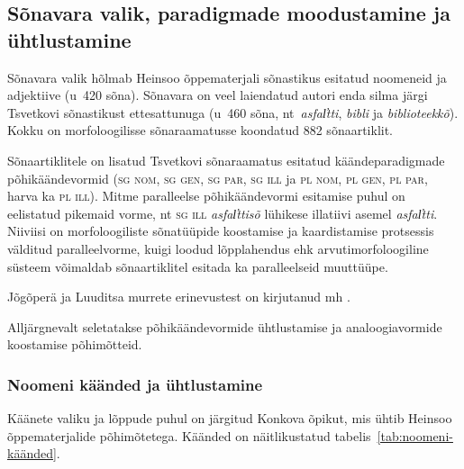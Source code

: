 \documentclass[12pt,a4paper]{article}
\newcommand{\vadja}[1]{\textit{#1}}
\newcommand{\msd}[1]{\textsc{#1}}
\begin{document}
\subsection{Sõnavara valik, paradigmade moodustamine ja ühtlustamine}
\label{sec:sõnavara-valik}

Sõnavara valik hõlmab Heinsoo õppematerjali sõnastikus esitatud noomeneid ja adjektiive (u~420 sõna). Sõnavara on veel laiendatud autori enda silma järgi Tsvetkovi sõnastikust ettesattunuga (u~460 sõna, nt~\vadja{asfal̕tti}, \vadja{bibli} ja \vadja{biblioteekkõ}). Kokku on morfoloogilisse sõnaraamatusse koondatud 882 sõna\-artiklit.

Sõnaartiklitele on lisatud Tsvetkovi sõnaraamatus esitatud käände\-paradigmade põhi\-käände\-vormid (\msd{sg nom}, \msd{sg gen}, \msd{sg par}, \msd{sg ill} ja  \msd{pl nom}, \msd{pl gen}, \msd{pl par}, harva ka \msd{pl ill}). Mitme paralleelse põhikäändevormi esitamise puhul on eelistatud pikemaid vorme, nt \msd{sg ill} \vadja{asfal̕ttisõ} lühikese illatiivi asemel \vadja{asfal̕tti}. Niiviisi on morfoloogiliste sõnatüüpide koostamise ja kaardistamise protsessis välditud paralleelvorme, kuigi loodud lõpplahendus ehk arvutimorfoloogiline süsteem võimaldab sõna\-artiklitel esitada ka paralleelseid muuttüüpe.

Jõgõperä ja Luuditsa murrete erinevustest on kirjutanud mh \cite{rozhanskiy_dialectal_2015}. %

Alljärgnevalt seletatakse põhikäändevormide ühtlustamise ja analoogiavormide koostamise põhimõtteid. %


\subsubsection{Noomeni käänded ja ühtlustamine}



Käänete valiku ja lõppude puhul on järgitud Konkova õpikut, mis ühtib Heinsoo õppe\-materjalide põhimõtetega. Käänded on näitlikustatud tabelis~\ref{tab:noomeni-käänded}.
\end{document}
